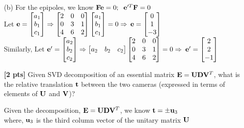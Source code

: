 \documentclass[11pt,addpoints,answers]{exam}
\numberwithin{equation}{section} %
\numberwithin{figure}{section} %
\numberwithin{table}{section} %
\begin{document}
\begin{questions}
\begin{tcolorbox}[fit,height=5cm, width=\textwidth, blank, borderline={0.5pt}{-2pt},halign=left, valign=center, nobeforeafter]
(b) For the epipoles, we know $\mathbf{F} \mathbf{e} =0; \hspace{0.2cm} \mathbf{e}'^T \mathbf{F} =0$\\
Let $\mathbf{e} = \begin{bmatrix} a_1 \\b_1\\ c_1 \end{bmatrix} \Rightarrow \begin{bmatrix}2 & 0 & 0 \\ 
0 & 3 & 1 \\ 
4 & 6 & 2\end{bmatrix} \begin{bmatrix} a_1 \\b_1\\ c_1 \end{bmatrix} =0 \Rightarrow$ \textcolor{red}{$\mathbf{e} =  \begin{bmatrix} 0 \\1\\ -3 \end{bmatrix}$}\\
Similarly, Let $\mathbf{e}' = \begin{bmatrix} a_2 \\b_2\\ c_2 \end{bmatrix} \Rightarrow \begin{bmatrix} a_2 &b_2& c_2 \end{bmatrix} \begin{bmatrix}2 & 0 & 0 \\ 
0 & 3 & 1 \\ 
4 & 6 & 2\end{bmatrix} =0\Rightarrow$ \textcolor{red}{$\mathbf{e}' =  \begin{bmatrix} 2 \\2\\ -1 \end{bmatrix}$}

\end{tcolorbox}

\question \textbf{[2 pts]} Given SVD decomposition of an essential matrix $\mathbf{E} = \mathbf{U}\mathbf{D}\mathbf{V}^T$, what is the relative translation $\mathbf{t}$ between the two cameras (expressed in terms of elements of $\mathbf{U}$  and $\mathbf{V}$)?

\begin{tcolorbox}[fit,height=2cm, width=\textwidth, blank, borderline={0.5pt}{-2pt},halign=left, valign=center, nobeforeafter]
Given the decomposition, $\mathbf{E} = \mathbf{U} \mathbf{D} \mathbf{V}^T$, we know \textcolor{red}{$\mathbf{t} = \pm \mathbf{u}_3$}\\
where, $\mathbf{u}_3$ is the third column vector of the unitary matrix $\mathbf{U}$


\end{tcolorbox}
\end{questions}
\end{document}
